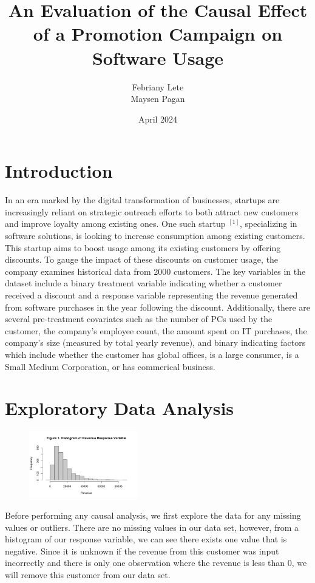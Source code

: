 \documentclass{article}
\author{Febriany Lete \\ Maysen Pagan}
\title{\textbf{An Evaluation of the Causal Effect of a Promotion Campaign on Software Usage}}
\date{April 2024}
\begin{document}
\maketitle

\section{Introduction}
In an era marked by the digital transformation of businesses, startups are increasingly reliant on strategic outreach efforts to both attract new customers and improve loyalty among existing ones. One such startup $^{[1]}$, specializing in software solutions, is looking to increase consumption among existing customers. This startup aims to boost usage among its existing customers by offering discounts. To gauge the impact of these discounts on customer usage, the company examines historical data from 2000 customers. The key variables in the dataset include a binary treatment variable indicating whether a customer received a discount and a response variable representing the revenue generated from software purchases in the year following the discount. Additionally, there are several pre-treatment covariates such as the number of PCs used by the customer, the company's employee count, the amount spent on IT purchases, the company's size (measured by total yearly revenue), and binary indicating factors which include whether the customer has global offices, is a large consumer, is a Small Medium Corporation, or has commerical business.

\section{Exploratory Data Analysis}

\begin{figure}
\centering
\includegraphics[width=0.42\textwidth]{figs/response_hist.png}
\end{figure}

Before performing any causal analysis, we first explore the data for any missing values or outliers. There are no missing values in our data set, however, from a histogram of our response variable, we can see there exists one value that is negative. Since it is unknown if the revenue from this customer was input incorrectly and there is only one observation where the revenue is less than 0, we will remove this customer from our data set.
\end{document}
